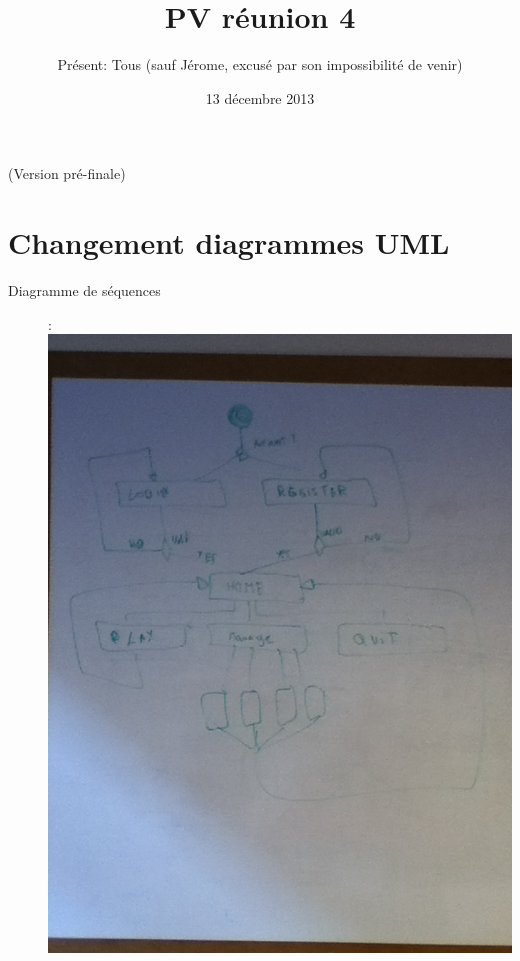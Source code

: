 \documentclass[a4paper,10pt]{article}
\author{Présent: Tous (sauf Jérome, excusé par son impossibilité de venir)}
\title{PV réunion 4}
\date{13 décembre 2013}
\begin{document}
\maketitle
\Large (Version pré-finale)
\part*{Changement diagrammes UML}
\begin{description}
\item[\LARGE Diagramme de séquences] :\\
\includegraphics[angle=-90, scale=0.5]{Sequence_Diagram.JPG}
\newpage


\end{description}
\end{document}
